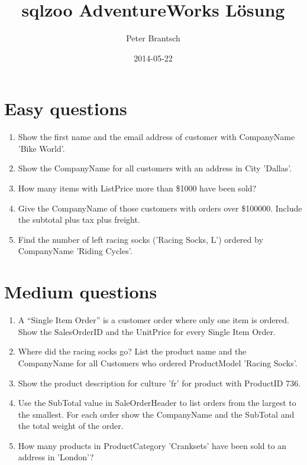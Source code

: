 \documentclass[a4paper]{article}
\begin{document}
	\title{sqlzoo AdventureWorks Lösung}
	\date{2014-05-22}
	\author{Peter Brantsch}
	\maketitle

	\section{Easy questions}
	\begin{enumerate}
		\item Show the first name and the email address of customer with
		CompanyName 'Bike World'.
			
		\item Show the CompanyName for all customers with an address in City
		'Dallas'.
			
		\item How many items with ListPrice more than \$1000 have been sold?
			
		\item Give the CompanyName of those customers with orders over
		\$100000. Include the subtotal plus tax plus freight.
			
		\item Find the number of left racing socks ('Racing Socks, L') ordered
		by CompanyName 'Riding Cycles'.
			
	\end{enumerate}

	\section{Medium questions}
	\begin{enumerate}
		\addtocounter{enumi}{5}
		\item A “Single Item Order” is a customer order where only one item is
		ordered. Show the SalesOrderID and the UnitPrice for every Single Item
		Order.
			
		\item Where did the racing socks go? List the product name and the
		CompanyName for all Customers who ordered ProductModel 'Racing Socks'.
			
		\item Show the product description for culture 'fr' for product with
		ProductID 736. 
			
		\item Use the SubTotal value in SaleOrderHeader to list orders from the
		largest to the smallest. For each order show the CompanyName and the
		SubTotal and the total weight of the order.
			
		\item How many products in ProductCategory 'Cranksets' have been sold
		to an address in 'London'?
			
	\end{enumerate}
\end{document}
